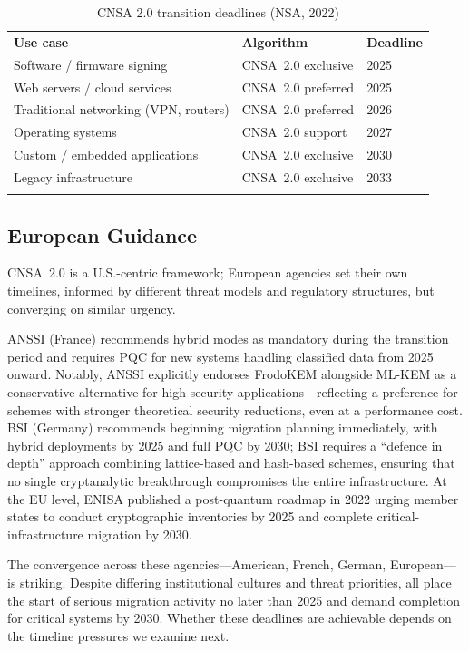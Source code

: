 \begin{table}[t]
\caption{CNSA 2.0 transition deadlines (NSA, 2022)}
\label{tab:cnsa20}
\begin{tabular}{p{4.5cm}p{3.5cm}p{3.5cm}}
\hline\noalign{\smallskip}
\textbf{Use case} & \textbf{Algorithm} & \textbf{Deadline} \\
\noalign{\smallskip}\svhline\noalign{\smallskip}
Software / firmware signing & CNSA~2.0 exclusive & 2025 \\
Web servers / cloud services & CNSA~2.0 preferred & 2025 \\
Traditional networking (VPN, routers) & CNSA~2.0 preferred & 2026 \\
Operating systems & CNSA~2.0 support & 2027 \\
Custom / embedded applications & CNSA~2.0 exclusive & 2030 \\
Legacy infrastructure & CNSA~2.0 exclusive & 2033 \\
\noalign{\smallskip}\hline
\end{tabular}
\end{table}

\subsection{European Guidance}
\label{subsec:eu-guidance}

CNSA~2.0 is a U.S.-centric framework; European agencies set their own timelines, informed by different threat models and regulatory structures, but converging on similar urgency.

ANSSI (France) recommends hybrid modes as mandatory during the transition period and requires PQC for new systems handling classified data from 2025 onward.  Notably, ANSSI explicitly endorses FrodoKEM alongside ML-KEM as a conservative alternative for high-security applications---reflecting a preference for schemes with stronger theoretical security reductions, even at a performance cost.  BSI (Germany) recommends beginning migration planning immediately, with hybrid deployments by 2025 and full PQC by 2030; BSI requires a ``defence in depth'' approach combining lattice-based and hash-based schemes, ensuring that no single cryptanalytic breakthrough compromises the entire infrastructure.  At the EU level, ENISA published a post-quantum roadmap in 2022 urging member states to conduct cryptographic inventories by 2025 and complete critical-infrastructure migration by 2030.

The convergence across these agencies---American, French, German, European---is striking.  Despite differing institutional cultures and threat priorities, all place the start of serious migration activity no later than 2025 and demand completion for critical systems by 2030.  Whether these deadlines are achievable depends on the timeline pressures we examine next.


